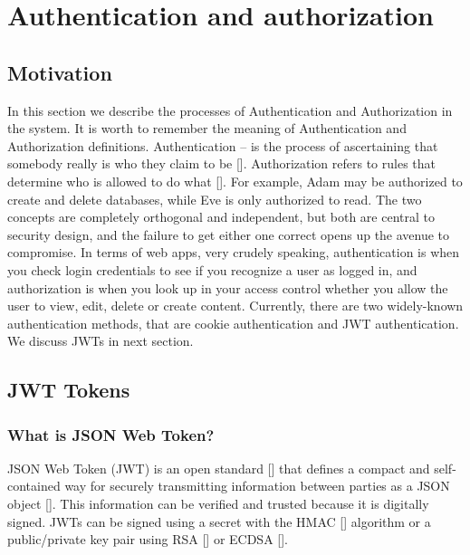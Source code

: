 \chapter{Authentication and authorization}\label{ch:authentication-and-authorization}


\section{Motivation}\label{sec:motivation}
In this section we describe the processes of Authentication and Authorization in the system.
It is worth to remember the meaning of Authentication and Authorization definitions.
Authentication -- is the process of ascertaining that somebody really is who they claim to be [\cite{burrows1989logic}].
Authorization refers to rules that determine who is allowed to do what [\cite{fagin1978authorization}].
For example, Adam may be authorized to create and delete databases, while Eve is only authorized to read.
The two concepts are completely orthogonal and independent, but both are central to security design, and the
failure to get either one correct opens up the avenue to compromise.
In terms of web apps, very crudely speaking, authentication is when you check login credentials to see if you recognize
a user as logged in, and authorization is when you look up in your access control whether you allow the user to view,
edit, delete or create content.
Currently, there are two widely-known authentication methods, that are cookie authentication and JWT authentication.
We discuss JWTs in next section.


\section{JWT Tokens}\label{sec:jwt-tokens}

\subsection{What is JSON Web Token?}\label{subsec:what-is-json-web-token?}
JSON Web Token (JWT) is an open standard [\cite{jones2015rfc}] that defines a compact and self-contained way for securely
transmitting information between parties as a JSON object [\cite{jones2015json}].
This information can be verified and trusted because it is digitally signed.
JWTs can be signed using a secret with the HMAC [\cite{wang2004hmac}] algorithm or a public/private key pair using
RSA [\cite{wiener1990cryptanalysis}] or ECDSA [\cite{johnson2001elliptic}].

